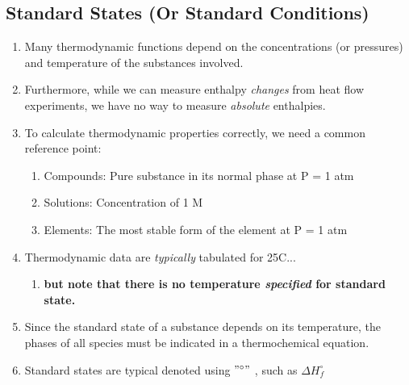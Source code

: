 \documentclass{article}  %
\begin{document}
\subsection*{Standard States (Or Standard Conditions)}
\begin{enumerate}
    \item Many thermodynamic functions depend on the concentrations (or pressures) and temperature of the substances involved.
    \item Furthermore, while we can measure enthalpy \emph{changes} from heat flow experiments, we have no way to measure \emph{absolute} enthalpies.
    \item To calculate thermodynamic properties correctly, we need a common reference point:
        \begin{enumerate}
            \item Compounds: Pure substance in its normal phase at P = 1 atm
            \item Solutions: Concentration of 1 M
            \item Elements: The most stable form of the element at P = 1 atm
        \end{enumerate}
    \item Thermodynamic data are \emph{typically} tabulated for 25C... 
        \begin{enumerate}
            \item \textbf{but note that there is no temperature \emph{specified} for standard state.}
        \end{enumerate}
    \item Since the standard state of a substance depends on its temperature, the phases of all species must be indicated in a thermochemical equation.
    \item Standard states are typical denoted using $"^\circ"$ , such as $\Delta H^\circ_f$
\end{enumerate}
\end{document}
